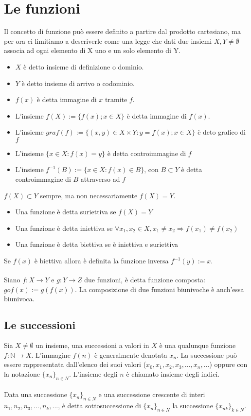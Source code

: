 \documentclass{article}
\begin{document}
\section{Le funzioni}
Il concetto di funzione può essere definito a partire dal prodotto cartesiano, ma per ora ci limitiamo a descriverle come una legge che dati due insiemi $X,Y \neq \emptyset$ associa ad ogni elemento di X uno e un solo elemento di Y.
\begin{itemize}
    \item $X$ è detto insieme di definizione o dominio.
    \item $Y$ è detto insieme di arrivo o codominio.
    \item $f(x)$ è detta immagine di $x$ tramite $f$.
    \item L'insieme $f(X):= \{f(x); x \in X \}$ è detta immagine di $f(x)$.
    \item L'insieme $graf(f) := \{(x,y) \in X \times Y: y=f(x); x \in X \}$ è deto grafico di $f$
    \item L'insieme $\{x \in X: f(x)=y \}$ è detta controimmagine di $f$
    \item L'insieme $f^{-1}(B) := \{x \in X: f(x) \in B \}$, con $B \subset Y$ è detta controimmagine di $B$ attraverso ad $f$
\end{itemize}
$f(X) \subset Y$ sempre, ma non necessariamente $f(X) = Y$.
\begin{itemize}
    \item Una funzione è detta suriettiva se $f(X) = Y$
    \item Una funzione è detta iniettiva se $\forall x_1,x_2 \in X, x_1 \neq x_2 \Rightarrow f(x_1) \neq f(x_2)$
    \item Una funzione è detta biettiva se è iniettiva e suriettiva
\end{itemize}
Se $f(x)$ è biettiva allora è definita la funzione inversa $f^{-1}(y):=x$.\\\\
Siano $f: X \rightarrow Y$ e $g: Y \rightarrow Z$ due funzioni, è detta funzione composta: $g o f(x):=g(f(x))$. La composizione di due funzioni biunivoche è anch'essa biunivoca.\\

\subsection{Le successioni}
Sia $X \neq \emptyset$ un insieme, una successioni a valori in $X$ è una qualunque funzione $f: \mathds{N} \rightarrow X.$ L'immagine $f(n)$ è generalmente denotata $x_n$. La successione può essere rappresentata dall'elenco dei suoi valori ($x_0,x_1,x_2,x_3,...,x_n,...$) oppure con la notazione  $\{x_n\}_{n \in N}$. L'insieme degli $n$ è chiamato insieme degli indici.\\\\
Data una successione $\{x_n\}_{n \in N}$ e una successione crescente di interi $n_1, n_2, n_3, ..., n_k, ...$, è detta sottosuccessione di $\{x_n\}_{n \in N}$ la successione $\{x_{nk}\}_{k \in N}$.
\end{document}
